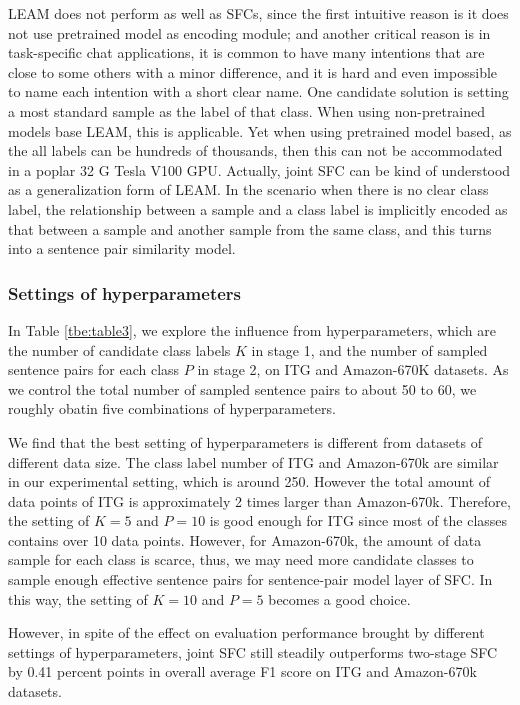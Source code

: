 LEAM  does not perform as well as SFCs, since the first intuitive reason is it
does  not use pretrained model as encoding module; and another critical reason
is  in  task-specific  chat applications, it is common to have many intentions
that are close to some others with a minor difference, and it is hard and even
impossible  to  name  each  intention  with  a short clear name. One candidate
solution  is  setting  a most standard sample as the label of that class. When
using  non-pretrained  models  base  LEAM,  this is applicable. Yet when using
pretrained  model  based, as the all labels can be hundreds of thousands, then
this  can not be accommodated in a poplar 32 G Tesla V100 GPU. Actually, joint
SFC  can  be  kind  of  understood  as  a  generalization form of LEAM. In the
scenario when there is no clear class label, the relationship between a sample
and  a class label is implicitly encoded as that between a sample and another
sample  from  the  same  class, and this turns into a sentence pair similarity
model.

\subsubsection*{Settings  of  hyperparameters} 
In  Table \ref{tbe:table3}, we explore the influence from hyperparameters, which
are  the  number  of  candidate  class  labels $K$ in stage 1, and the number of
sampled  sentence  pairs  for  each class $P$ in stage 2, on ITG and Amazon-670K
datasets.  As we control the total number of sampled sentence pairs to about 50 to 60, we
roughly obatin five combinations of hyperparameters.  

We find  that the best setting of hyperparameters is different from datasets
of  different  data  size.  The  class label number of ITG and Amazon-670k are
similar  in  our  experimental setting, which is around 250. However the total
amount of data points of ITG is approximately 2 times larger than Amazon-670k.
Therefore,  the  setting of $K=5$ and $P=10$ is good enough for ITG since most
of  the  classes  contains  over 10 data points. However, for Amazon-670k, the
amount  of  data  sample  for  each  class  is  scarce, thus, we may need more
candidate  classes to sample enough effective sentence pairs for sentence-pair
model  layer  of  SFC.  In this way, the setting of $K=10$ and $P=5$ becomes a
good choice. 

However,  in  spite of the effect on evaluation performance brought by different
settings  of hyperparameters, joint SFC still steadily outperforms two-stage SFC
by  0.41  percent  points  in  overall  average  F1 score on ITG and Amazon-670k
datasets.

